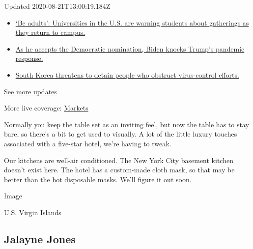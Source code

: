 Updated 2020-08-21T13:00:19.184Z

\begin{itemize}
\tightlist
\item
  \href{https://www.nytimes3xbfgragh.onion/2020/08/21/world/covid-19-coronavirus.html?action=click\&pgtype=Article\&state=default\&region=MAIN_CONTENT_1\&context=storylines_live_updates\#link-6a60a19d}{`Be
  adults': Universities in the U.S. are warning students about
  gatherings as they return to campus.}
\item
  \href{https://www.nytimes3xbfgragh.onion/2020/08/21/world/covid-19-coronavirus.html?action=click\&pgtype=Article\&state=default\&region=MAIN_CONTENT_1\&context=storylines_live_updates\#link-324af071}{As
  he accepts the Democratic nomination, Biden knocks Trump's pandemic
  response.}
\item
  \href{https://www.nytimes3xbfgragh.onion/2020/08/21/world/covid-19-coronavirus.html?action=click\&pgtype=Article\&state=default\&region=MAIN_CONTENT_1\&context=storylines_live_updates\#link-191d44be}{South
  Korea threatens to detain people who obstruct virus-control efforts.}
\end{itemize}

\href{https://www.nytimes3xbfgragh.onion/2020/08/21/world/covid-19-coronavirus.html?action=click\&pgtype=Article\&state=default\&region=MAIN_CONTENT_1\&context=storylines_live_updates}{See
more updates}

More live coverage:
\href{https://www.nytimes3xbfgragh.onion/live/2020/08/21/business/stock-market-today-coronavirus?action=click\&pgtype=Article\&state=default\&region=MAIN_CONTENT_1\&context=storylines_live_updates}{Markets}

Normally you keep the table set as an inviting feel, but now the table
has to stay bare, so there's a bit to get used to visually. A lot of the
little luxury touches associated with a five-star hotel, we're having to
tweak.

Our kitchens are well-air conditioned. The New York City basement
kitchen doesn't exist here. The hotel has a custom-made cloth mask, so
that may be better than the hot disposable masks. We'll figure it out
soon.

Image

U.S. Virgin Islands

\hypertarget{jalayne-jones}{%
\subsection{Jalayne Jones}\label{jalayne-jones}}

